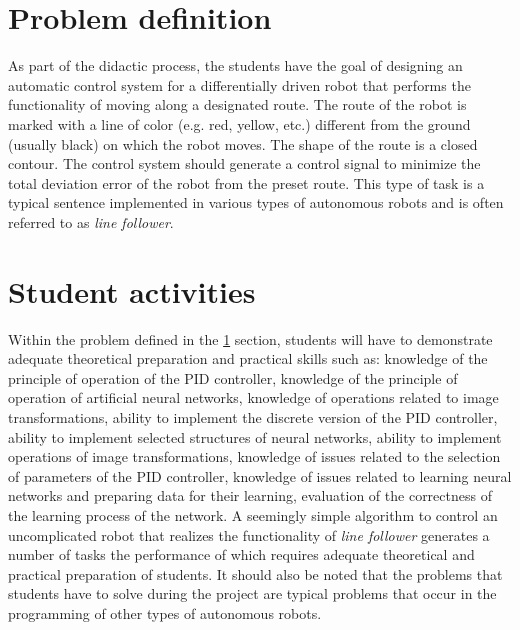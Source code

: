 \documentclass[conference]{IEEEtran}
\begin{document}

\section{Problem definition}\label{sec:problem-definition}
As part of the didactic process, the students have the goal of designing an automatic control system for a differentially driven robot that performs the functionality of moving along a designated route. The route of the robot is marked with a line of color (e.g. red, yellow, etc.) different from the ground (usually black) on which the robot moves. The shape of the route is a closed contour. The control system should generate a control signal to minimize the total deviation error of the robot from the preset route.  This type of task is a typical sentence implemented in various types of autonomous robots and is often referred to as \emph{line follower}.  


\section{Student activities}\label{sec:student-activity}
Within the problem defined in the \ref{sec:problem-definition} section, students will have to demonstrate adequate theoretical preparation and practical skills such as: knowledge of the principle of operation of the PID controller, knowledge of the principle of operation of artificial neural networks, knowledge of operations related to image transformations, ability to implement the discrete version of the PID controller, ability to implement selected structures of neural networks, ability to implement operations of image transformations, knowledge of issues related to the selection of parameters of the PID controller, knowledge of issues related to learning neural networks and preparing data for their learning, evaluation of the correctness of the learning process of the network. A seemingly simple algorithm to control an uncomplicated robot that realizes the functionality of \emph{line follower} generates a number of tasks the performance of which requires adequate theoretical and practical preparation of students. It should also be noted that the problems that students have to solve during the project are typical problems that occur in the programming of other types of autonomous robots.

\end{document}
